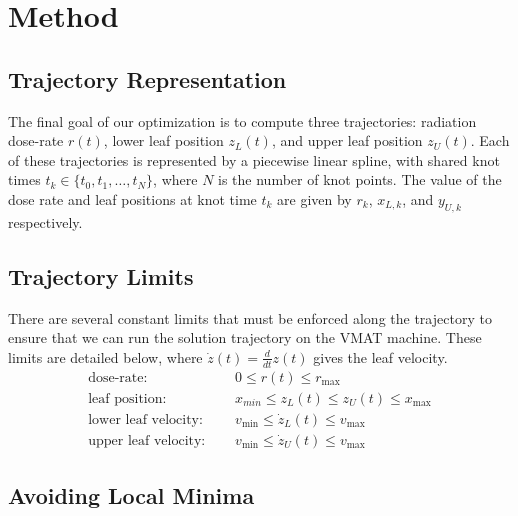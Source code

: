 \section{Method}


\subsection{Trajectory Representation}

The final goal of our optimization is to compute three trajectories:
radiation dose-rate $r(t)$, lower leaf position $z_L(t)$, and upper leaf position $z_U(t)$.
Each of these trajectories is represented by a piecewise linear spline,
with shared knot times $t_k \in \{t_0, t_1, \dots, t_N\}$, where $N$ is the number of knot points.
The value of the dose rate and leaf positions at knot time $t_k$ are given by
$r_k$, $x_{L,k}$, and $y_{U,k}$ respectively.


\subsection{Trajectory Limits}

There are several constant limits that must be enforced along the trajectory
to ensure that we can run the solution trajectory on the VMAT machine.
These limits are detailed below, where $\dot{z}(t) = \tfrac{d}{dt}z(t)$ gives the leaf velocity.
\begin{align}
  \text{dose-rate: }& \quad 0 \leq r(t) \leq r_\text{max}
      \label{eqn:FirstTrajectoryConstraint}\\
  \text{leaf position: }& \quad x_{min} \leq z_L(t) \leq z_U(t) \leq x_\text{max} \\
  \text{lower leaf velocity: }& \quad v_\text{min} \leq \dot{z}_L(t) \leq v_\text{max} \\
  \text{upper leaf velocity: }& \quad v_\text{min} \leq \dot{z}_U(t) \leq v_\text{max}
      \label{eqn:LastTrajectoryConstraint}
\end{align}

\subsection{Avoiding Local Minima}

